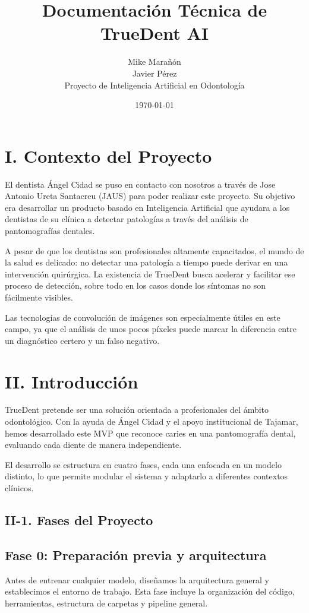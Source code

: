 \documentclass[a4paper,12pt]{article}
\title{Documentación Técnica de TrueDent AI}
\author{
  Mike Marañón \\ 
  Javier Pérez \\ 
  Proyecto de Inteligencia Artificial en Odontología
}
\date{\today}
\begin{document}
\maketitle
\tableofcontents


\section*{I. Contexto del Proyecto}

El dentista Ángel Cidad se puso en contacto con nosotros a través de Jose Antonio Ureta Santacreu (JAUS) para poder realizar este proyecto. Su objetivo era desarrollar un producto basado en Inteligencia Artificial que ayudara a los dentistas de su clínica a detectar patologías a través del análisis de pantomografías dentales.

A pesar de que los dentistas son profesionales altamente capacitados, el mundo de la salud es delicado: no detectar una patología a tiempo puede derivar en una intervención quirúrgica. La existencia de TrueDent busca acelerar y facilitar ese proceso de detección, sobre todo en los casos donde los síntomas no son fácilmente visibles.

Las tecnologías de convolución de imágenes son especialmente útiles en este campo, ya que el análisis de unos pocos píxeles puede marcar la diferencia entre un diagnóstico certero y un falso negativo.

\section*{II. Introducción}

TrueDent pretende ser una solución orientada a profesionales del ámbito odontológico. Con la ayuda de Ángel Cidad y el apoyo institucional de Tajamar, hemos desarrollado este MVP que reconoce caries en una pantomografía dental, evaluando cada diente de manera independiente.

El desarrollo se estructura en cuatro fases, cada una enfocada en un modelo distinto, lo que permite modular el sistema y adaptarlo a diferentes contextos clínicos.

\subsection*{II-1. Fases del Proyecto}

\subsection*{Fase 0: Preparación previa y arquitectura}
Antes de entrenar cualquier modelo, diseñamos la arquitectura general y establecimos el entorno de trabajo. Esta fase incluye la organización del código, herramientas, estructura de carpetas y pipeline general.
\end{document}
